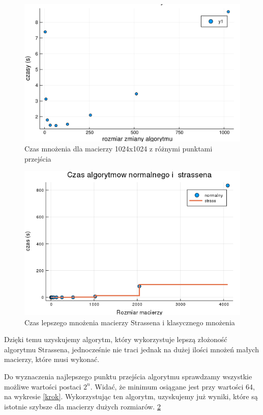 \documentclass[paper=a4, fontsize=11pt]{scrartcl} %
\numberwithin{equation}{section} %
\numberwithin{figure}{section} %
\numberwithin{table}{section} %
\begin{document}
\begin{figure}[h!]
  \includegraphics[width=0.95\linewidth]{krok.jpg}
  \caption{Czas mnożenia dla macierzy 1024x1024 z różnymi punktami przejścia}
  \label{szybkosc}
\end{figure}
\begin{figure}[h!]
  \includegraphics[width=0.95\linewidth]{szybkosc.png}
  \caption{Czas lepszego mnożenia macierzy Strassena i klasycznego mnożenia}
  \label{szybkosc}
\end{figure}
 
Dzięki temu uzyskujemy algorytm, który wykorzystuje lepszą złożoność algorytmu Strassena, 
jednocześnie nie traci jednak na dużej ilości mnożeń małych macierzy, które musi wykonać.\medbreak

Do wyznaczenia najlepszego punktu przejścia algorytmu sprawdzamy wszystkie możliwe wartości postaci ${2^n}$.
Widać, że minimum osiągane jest przy wartości 64, na wykresie \ref{krok}.\medbreak
Wykorzystując ten algorytm, uzyskujemy już wyniki, które są istotnie szybsze dla macierzy dużych rozmiarów. \ref{szybkosc}
\FloatBarrier
\end{document}
